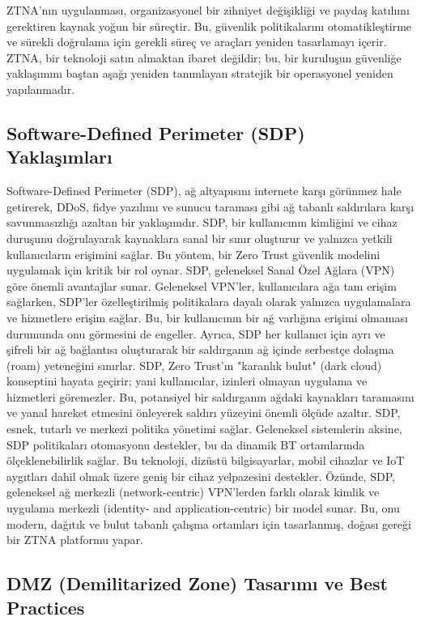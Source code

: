 ZTNA'nın uygulanması, organizasyonel bir zihniyet değişikliği ve paydaş katılımı gerektiren kaynak yoğun bir süreçtir. Bu, güvenlik politikalarını otomatikleştirme ve sürekli doğrulama için gerekli süreç ve araçları yeniden tasarlamayı içerir. ZTNA, bir teknoloji satın almaktan ibaret değildir; bu, bir kuruluşun güvenliğe yaklaşımını baştan aşağı yeniden tanımlayan stratejik bir operasyonel yeniden yapılanmadır.

\subsection{Software-Defined Perimeter (SDP) Yaklaşımları}

Software-Defined Perimeter (SDP), ağ altyapısını internete karşı görünmez hale getirerek, DDoS, fidye yazılımı ve sunucu taraması gibi ağ tabanlı saldırılara karşı savunmasızlığı azaltan bir yaklaşımdır. SDP, bir kullanıcının kimliğini ve cihaz duruşunu doğrulayarak kaynaklara sanal bir sınır oluşturur ve yalnızca yetkili kullanıcıların erişimini sağlar. Bu yöntem, bir Zero Trust güvenlik modelini uygulamak için kritik bir rol oynar.
SDP, geleneksel Sanal Özel Ağlara (VPN) göre önemli avantajlar sunar. Geleneksel VPN'ler, kullanıcılara ağa tam erişim sağlarken, SDP'ler özelleştirilmiş politikalara dayalı olarak yalnızca uygulamalara ve hizmetlere erişim sağlar. Bu, bir kullanıcının bir ağ varlığına erişimi olmaması durumunda onu görmesini de engeller. Ayrıca, SDP her kullanıcı için ayrı ve şifreli bir ağ bağlantısı oluşturarak bir saldırganın ağ içinde serbestçe dolaşma (roam) yeteneğini sınırlar. SDP, Zero Trust'ın "karanlık bulut" (dark cloud) konseptini hayata geçirir; yani kullanıcılar, izinleri olmayan uygulama ve hizmetleri göremezler. Bu, potansiyel bir saldırganın ağdaki kaynakları taramasını ve yanal hareket etmesini önleyerek saldırı yüzeyini önemli ölçüde azaltır.
SDP, esnek, tutarlı ve merkezi politika yönetimi sağlar. Geleneksel sistemlerin aksine, SDP politikaları otomasyonu destekler, bu da dinamik BT ortamlarında ölçeklenebilirlik sağlar. Bu teknoloji, dizüstü bilgisayarlar, mobil cihazlar ve IoT aygıtları dahil olmak üzere geniş bir cihaz yelpazesini destekler. Özünde, SDP, geleneksel ağ merkezli (network-centric) VPN'lerden farklı olarak kimlik ve uygulama merkezli (identity- and application-centric) bir model sunar. Bu, onu modern, dağıtık ve bulut tabanlı çalışma ortamları için tasarlanmış, doğası gereği bir ZTNA platformu yapar.

\subsection{DMZ (Demilitarized Zone) Tasarımı ve Best Practices}

